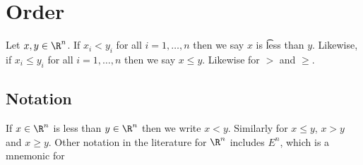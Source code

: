 \section*{Order}

Let $x, y \in \R ^n$.
If $x_i < y_i$ for all $i = 1, \dots , n$ then we say $x$ is \t{less than} $y$.
Likewise, if $x_i \leq y_i$ for all $i = 1, \dots , n$ then we say $x \leq y$.
Likewise for $>$ and $\geq$.

\subsection*{Notation}

If $x \in \R ^n$ is less than $y \in \R ^n$ then we write $x < y$.
Similarly for $x \leq y$, $x > y$ and $x \geq y$.
Other notation in the literature for $\R ^n$ includes $E^n$, which is a mnemonic for 
